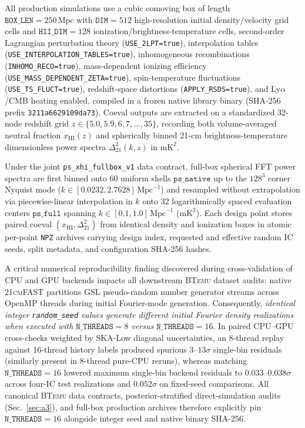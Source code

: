\documentclass[aps,prd,reprint,superscriptaddress,nofootinbib,amsmath,amssymb,floatfix,longbibliography]{revtex4-2}
\begin{document}
All production simulations use a cubic comoving box of length $\texttt{BOX\_LEN}=250\,\mathrm{Mpc}$ with $\texttt{DIM}=512$ high-resolution initial density/velocity grid cells and $\texttt{HII\_DIM}=128$ ionization/brightness-temperature cells, second-order Lagrangian perturbation theory (\texttt{USE\_2LPT=true}), interpolation tables (\texttt{USE\_INTERPOLATION\_TABLES=true}), inhomogeneous recombinations (\texttt{INHOMO\_RECO=true}), mass-dependent ionizing efficiency (\texttt{USE\_MASS\_DEPENDENT\_ZETA=true}), spin-temperature fluctuations (\texttt{USE\_TS\_FLUCT=true}), redshift-space distortions (\texttt{APPLY\_RSDS=true}), and Ly$\alpha$/CMB heating enabled, compiled in a frozen native library binary (SHA-256 prefix \texttt{3211a6629109da73}). Coeval outputs are extracted on a standardized 32-node redshift grid $z \in \{5.0, 5.9, 6, 7, \dots, 35\}$, recording both volume-averaged neutral fraction $x_{\mathrm{HI}}(z)$ and spherically binned 21-cm brightness-temperature dimensionless power spectra $\Delta^2_{21}(k,z)$ in $\mathrm{mK}^2$.

Under the joint \texttt{ps\_xhi\_fullbox\_v1} data contract, full-box spherical FFT power spectra are first binned onto 60 uniform shells $\texttt{ps\_native}$ up to the $128^3$ corner Nyquist mode ($k \in [0.0232, 2.7628]\,\mathrm{Mpc}^{-1}$) and resampled without extrapolation via piecewise-linear interpolation in $k$ onto 32 logarithmically spaced evaluation centers $\texttt{ps\_full}$ spanning $k \in [0.1, 1.0]\,\mathrm{Mpc}^{-1}$ ($\mathrm{mK}^2$). Each design point stores paired coeval $(x_{\mathrm{HI}}, \Delta^2_{21})$ from identical density and ionization boxes in atomic per-point \texttt{NPZ} archives carrying design index, requested and effective random IC seeds, split metadata, and configuration SHA-256 hashes.

A critical numerical reproducibility finding discovered during cross-validation of CPU and GPU backends impacts all downstream \textsc{BTemu} dataset audits: native \textsc{21cmFAST} partitions GSL pseudo-random number generator streams across OpenMP threads during initial Fourier-mode generation. Consequently, \emph{identical integer \texttt{random\_seed} values generate different initial Fourier density realizations when executed with $\texttt{N\_THREADS}=8$ versus $\texttt{N\_THREADS}=16$}. In paired CPU--GPU cross-checks weighted by SKA-Low diagonal uncertainties, an 8-thread replay against 16-thread history labels produced spurious $3\text{--}13\sigma$ single-bin residuals (similarly present in 8-thread pure-CPU reruns), whereas matching $\texttt{N\_THREADS}=16$ lowered maximum single-bin backend residuals to $0.033\text{--}0.038\sigma$ across four-IC test realizations and $0.052\sigma$ on fixed-seed comparisons. All canonical \textsc{BTemu} data contracts, posterior-stratified direct-simulation audits (Sec.~\ref{sec:a3}), and full-box production archives therefore explicitly pin $\texttt{N\_THREADS}=16$ alongside integer seed and native binary SHA-256.
\end{document}
